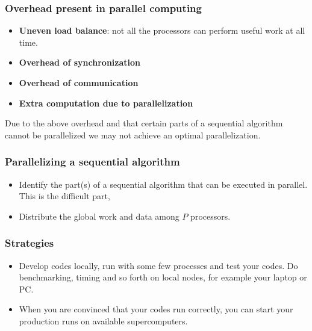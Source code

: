 \documentclass{beamer}
\begin{document}
\begin{frame}
\frametitle{Overhead present in parallel computing}

\begin{block}{}

\begin{itemize}
\item \textbf{Uneven load balance}:  not all the processors can perform useful work at all time.

\item \textbf{Overhead of synchronization}

\item \textbf{Overhead of communication}

\item \textbf{Extra computation due to parallelization}
\end{itemize}

\noindent
Due to the above overhead and that certain parts of a sequential
algorithm cannot be parallelized we may not achieve an optimal parallelization.
\end{block}
\end{frame}

\begin{frame}
\frametitle{Parallelizing a sequential algorithm}

\begin{block}{}

\begin{itemize}
\item Identify the part(s) of a sequential algorithm that can be  executed in parallel. This is the difficult part,

\item Distribute the global work and data among $P$ processors.
\end{itemize}

\noindent
\end{block}
\end{frame}

\begin{frame}
\frametitle{Strategies}

\begin{block}{}
\begin{itemize}
\item Develop codes locally, run with some few processes and test your codes.  Do benchmarking, timing and so forth on local nodes, for example your laptop or PC. 

\item When you are convinced that your codes run correctly, you can start your production runs on available supercomputers.
\end{itemize}

\noindent
\end{block}
\end{frame}
\end{document}
